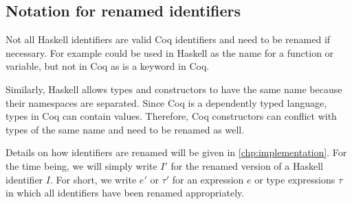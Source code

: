 \subsection{Notation for renamed identifiers}
Not all Haskell identifiers are valid Coq identifiers and need to be renamed if necessary.
For example  could be used in Haskell as the name for a function or variable, but not in Coq as  is a keyword in Coq.

Similarly, Haskell allows types and constructors to have the same name because their namespaces are separated.
Since Coq is a dependently typed language, types in Coq can contain values.
Therefore, Coq constructors can conflict with types of the same name and need to be renamed as well.

Details on how identifiers are renamed will be given in \autoref{chp:implementation}.
For the time being, we will simply write $I'$ for the renamed version of a Haskell identifier $I$.
For short, we write $e'$ or $\tau'$ for an expression $e$ or type expressions $\tau$ in which all identifiers have been renamed appropriately.
